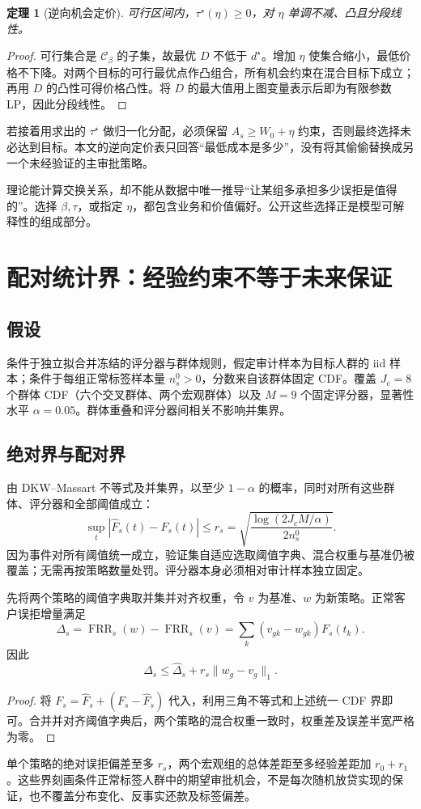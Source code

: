 \documentclass[UTF8,11pt,fontset=fandol]{ctexart}
\newtheorem{theorem}{定理}[section]
\newcommand{\C}{\mathcal C}
\begin{document}
\begin{theorem}[逆向机会定价]
可行区间内，$\tau^\star(\eta)\ge0$，对 $\eta$ 单调不减、凸且分段线性。
\end{theorem}
\begin{proof}
可行集合是 $\C_\beta$ 的子集，故最优 $D$ 不低于 $d^\star$。增加 $\eta$ 使集合缩小，最低价格不下降。对两个目标的可行最优点作凸组合，所有机会约束在混合目标下成立；再用 $D$ 的凸性可得价格凸性。将 $D$ 的最大值用上图变量表示后即为有限参数 LP，因此分段线性。
\end{proof}
若接着用求出的 $\tau^\star$ 做归一化分配，必须保留 $A_s\ge W_0+\eta$ 约束，否则最终选择未必达到目标。本文的逆向定价表只回答“最低成本是多少”，没有将其偷偷替换成另一个未经验证的主审批策略。

理论能计算交换关系，却不能从数据中唯一推导“让某组多承担多少误拒是值得的”。选择 $\beta,\tau$，或指定 $\eta$，都包含业务和价值偏好。公开这些选择正是模型可解释性的组成部分。

\section{配对统计界：经验约束不等于未来保证}
\subsection{假设}
条件于独立拟合并冻结的评分器与群体规则，假定审计样本为目标人群的 iid 样本；条件于每组正常标签样本量 $n_s^0>0$，分数来自该群体固定 CDF。覆盖 $J_c=8$ 个群体 CDF（六个交叉群体、两个宏观群体）以及 $M=9$ 个固定评分器，显著性水平 $\alpha=0.05$。群体重叠和评分器间相关不影响并集界。

\subsection{绝对界与配对界}
由 DKW--Massart 不等式\cite{massart}及并集界，以至少 $1-\alpha$ 的概率，同时对所有这些群体、评分器和全部阈值成立：
\[
\sup_t|\widehat F_s(t)-F_s(t)|\le
r_s=\sqrt{\frac{\log(2J_cM/\alpha)}{2n_s^0}}.
\]
因为事件对所有阈值统一成立，验证集自适应选取阈值字典、混合权重与基准仍被覆盖；无需再按策略数量处罚。评分器本身必须相对审计样本独立固定。

先将两个策略的阈值字典取并集并对齐权重，令 $v$ 为基准、$w$ 为新策略。正常客户误拒增量满足
\[
\Delta_s=\operatorname{FRR}_s(w)-\operatorname{FRR}_s(v)
=\sum_k(v_{gk}-w_{gk})F_s(t_k).
\]
因此
\[
\boxed{
\Delta_s\le\widehat\Delta_s+
r_s\|w_g-v_g\|_1.}
\]
\begin{proof}
将 $F_s=\widehat F_s+(F_s-\widehat F_s)$ 代入，利用三角不等式和上述统一 CDF 界即可。合并并对齐阈值字典后，两个策略的混合权重一致时，权重差及误差半宽严格为零。
\end{proof}
单个策略的绝对误拒偏差至多 $r_s$，两个宏观组的总体差距至多经验差距加 $r_0+r_1$。这些界刻画条件正常标签人群中的期望审批机会，不是每次随机放贷实现的保证，也不覆盖分布变化、反事实还款及标签偏差。
\end{document}

